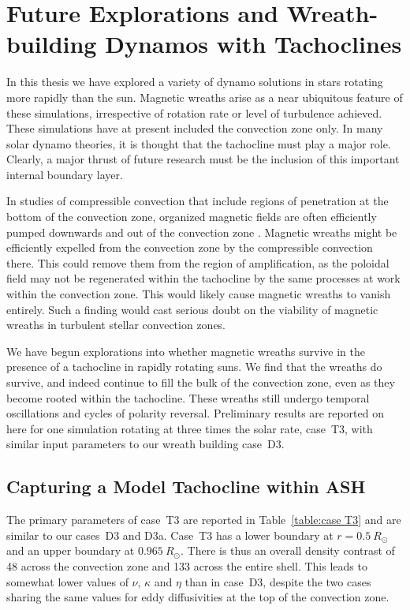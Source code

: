 \chapter{Future Explorations and Wreath-building Dynamos with Tachoclines}
\label{chapter:the promise of the future}
In this thesis we have explored a variety of dynamo solutions in stars
rotating more rapidly than the sun.  Magnetic wreaths arise as a near
ubiquitous feature of these simulations, irrespective of rotation rate
or level of turbulence achieved.  These simulations have at present
included the convection zone only.  In many solar dynamo theories,
it is thought that the tachocline must play a major role.  Clearly, a
major thrust of future research must be the inclusion of this
important internal boundary layer.  

In studies of compressible convection that include regions of
penetration at the bottom of the convection zone, organized magnetic
fields are often efficiently pumped downwards and out of the
convection zone \citep[e.g.,][]{Tobias_et_al_2001,
  Browning_et_al_2006}.  Magnetic wreaths might be efficiently
expelled from the convection zone by the compressible convection
there.  This could remove them from the region of amplification, as
the poloidal field may not be regenerated within the tachocline by the
same processes at work within the convection zone.  This would
likely cause magnetic wreaths to vanish entirely.  Such a finding
would cast serious doubt on the viability of magnetic wreaths in turbulent
stellar convection zones.

We have begun explorations into whether magnetic wreaths survive in
the presence of a tachocline in rapidly rotating suns.  We find that
the wreaths do survive, and indeed continue to fill the bulk of the
convection zone, even as they become rooted within the tachocline.
These wreaths still undergo temporal oscillations and cycles of
polarity reversal.  Preliminary results are reported on
here for one simulation rotating at three times the solar rate,
case~T3, with similar input parameters to our wreath building
case~D3. 

\section{Capturing a Model Tachocline within ASH}
The primary parameters of case~T3 are reported in Table~\ref{table:case
  T3} and are similar to our cases~D3 and D3a.  Case~T3 has a lower
boundary at $r=0.5\:R_\odot$ and an upper boundary at
$0.965\:R_\odot$.  There is thus an overall
density contrast of 48 across the convection zone and 133 
across the entire shell.  This leads to somewhat lower values of
$\nu$, $\kappa$ and $\eta$ than in case~D3, despite the two
cases sharing the same values for eddy diffusivities at the top of the
convection zone.   

